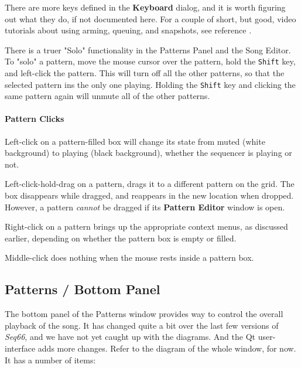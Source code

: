    There are more keys defined in the \textbf{Keyboard} dialog, and it is
   worth figuring out what they do, if not documented here.
   For a couple of short, but good, video tutorials about using arming,
   queuing, and snapshots, see reference \cite{wootangent1}.

   There is a truer "Solo" functionality in the Patterns
   Panel and the Song Editor.  To "solo" a pattern, move the mouse cursor
   over the pattern, hold the \texttt{Shift} key, and left-click the pattern.
   This will turn off all the other patterns, so that the selected pattern ins
   the only one playing.  Holding the \texttt{Shift} key and clicking the same
   pattern again will unmute all of the other patterns.

\paragraph{Pattern Clicks}
\label{paragraph:patterns_pattern_Clicks}

   Left-click on a pattern-filled box will change its state
   from muted (white background) to playing (black background), whether
   the sequencer is playing or not.

   Left-click-hold-drag on a pattern, drags it to a different
   pattern on the grid.
   The box disappears while dragged, and reappears in the new location when
   dropped.  However, a pattern \textsl{cannot} be dragged if its
   \textbf{Pattern Editor} window is open.

   Right-click on a pattern brings up the appropriate context menus, as
   discussed earlier, depending on whether the pattern box is empty or
   filled.

   Middle-click does nothing when the mouse rests inside a pattern box.

\subsection{Patterns / Bottom Panel}
\label{subsec:patterns_panel_bottom}

   The bottom panel of the Patterns window provides way to control the
   overall playback of the song.  It has changed quite a bit over the last few
   versions of \textsl{Seq66}, and we have not yet caught up with the
   diagrams. And the Qt user-interface adds more changes.
   Refer to the diagram of the whole window, for now.
   It has a number of items:

